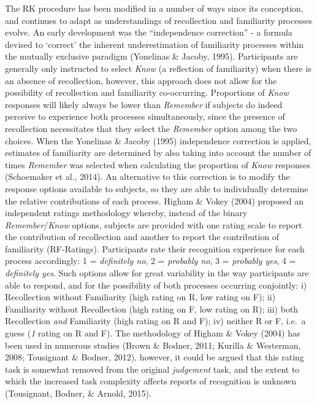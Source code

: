 \documentclass[
  11pt,
]{article}
\begin{document}
The RK procedure has been modified in a number of ways since its
conception, and continues to adapt as understandings of recollection and
familiarity processes evolve. An early development was the
``independence correction'' - a formula devised to `correct' the
inherent underestimation of familiarity processes within the mutually
exclusive paradigm (Yonelinas \& Jacoby, 1995). Participants are
generally only instructed to select \emph{Know} (a reflection of
familiarity) when there is an absence of recollection, however, this
approach does not allow for the possibility of recollection and
familiarity co-occurring. Proportions of \emph{Know} responses will
likely always be lower than \emph{Remember} if subjects do indeed
perceive to experience both processes simultaneously, since the presence
of recollection necessitates that they select the \emph{Remember} option
among the two choices. When the Yonelinas \& Jacoby (1995) independence
correction is applied, estimates of familiarity are determined by also
taking into account the number of times \emph{Remember} was selected
when calculating the proportion of \emph{Know} responses (Schoemaker et
al., 2014). An alternative to this correction is to modify the response
options available to subjects, so they are able to individually
determine the relative contributions of each process. Higham \& Vokey
(2004) proposed an independent ratings methodology whereby, instead of
the binary \emph{Remember}/\emph{Know} options, subjects are provided
with one rating scale to report the contribution of recollection and
another to report the contribution of familiarity (RF-Ratings).
Participants rate their recognition experience for each process
accordingly: 1 = \emph{definitely no}, 2 = \emph{probably no}, 3 =
\emph{probably yes}, 4 = \emph{definitely yes}. Such options allow for
great variability in the way participants are able to respond, and for
the possibility of both processes occurring conjointly: i) Recollection
without Familiarity (high rating on R, low rating on F); ii) Familiarity
without Recollection (high rating on F, low rating on R); iii) both
Recollection \emph{and} Familiarity (high rating on R and F); iv)
neither R or F, i.e.~a guess (\emph{1} rating on R and F). The
methodology of Higham \& Vokey (2004) has been used in numerous studies
(Brown \& Bodner, 2011; Kurilla \& Westerman, 2008; Tousignant \&
Bodner, 2012), however, it could be argued that this rating task is
somewhat removed from the original \emph{judgement} task, and the extent
to which the increased task complexity affects reports of recognition is
unknown (Tousignant, Bodner, \& Arnold, 2015).
\end{document}
